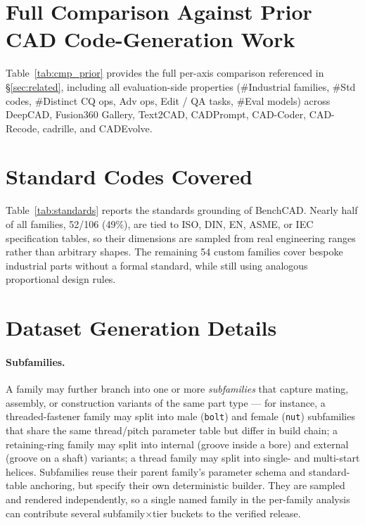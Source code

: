 \section{Full Comparison Against Prior CAD Code-Generation Work}
\label{app:cmp_prior}

Table~\ref{tab:cmp_prior} provides the full per-axis comparison referenced in \S\ref{sec:related}, including all evaluation-side properties (\#Industrial families, \#Std codes, \#Distinct CQ ops, Adv ops, Edit / QA tasks, \#Eval models) across DeepCAD, Fusion360 Gallery, Text2CAD, CADPrompt, CAD-Coder, CAD-Recode, cadrille, and CADEvolve.



\section{Standard Codes Covered}
\label{app:standards}
Table~\ref{tab:standards} reports the standards grounding of BenchCAD. 
Nearly half of all families, 52/106 (49\%), are tied to ISO, DIN, EN, ASME, or IEC specification tables, so their dimensions are sampled from real engineering ranges rather than arbitrary shapes. 
The remaining 54 custom families cover bespoke industrial parts without a formal standard, while still using analogous proportional design rules.




\section{Dataset Generation Details}
\label{app:datagen}

\paragraph{Subfamilies.} A family may further branch into one or more \emph{subfamilies} that capture mating, assembly, or construction variants of the same part type --- for instance, a threaded-fastener family may split into male (\texttt{bolt}) and female (\texttt{nut}) subfamilies that share the same thread/pitch parameter table but differ in build chain; a retaining-ring family may split into internal (groove inside a bore) and external (groove on a shaft) variants; a thread family may split into single- and multi-start helices. Subfamilies reuse their parent family's parameter schema and standard-table anchoring, but specify their own deterministic builder. They are sampled and rendered independently, so a single named family in the per-family analysis can contribute several subfamily$\times$tier buckets to the verified release.

